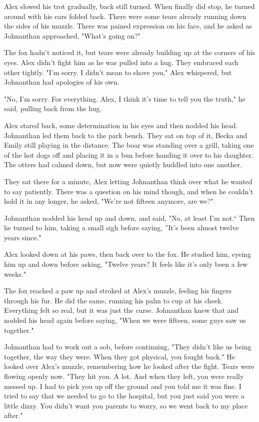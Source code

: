 Alex slowed his trot gradually, back still turned. When finally did
stop, he turned around with his ears folded back. There were some tears
already running down the sides of his muzzle. There was pained
expression on his face, and he asked as Johnanthan approached, "What's
going on?"

The fox hadn't noticed it, but tears were already building up at the
corners of his eyes. Alex didn't fight him as he was pulled into a hug.
They embraced each other tightly. "I'm sorry. I didn't mean to shove
you," Alex whispered, but Johnanthan had apologies of his own.

"No, I'm sorry. For everything. Alex, I think it's time to tell you the
truth," he said, pulling back from the hug.

Alex stared back, some determination in his eyes and then nodded his
head. Johnanthan led them back to the park bench. They sat on top of it,
Becka and Emily still playing in the distance. The boar was standing
over a grill, taking one of the hot dogs off and placing it in a bun
before handing it over to his daughter. The otters had calmed down, but
now were quietly huddled into one another.

They sat there for a minute, Alex letting Johnanthan think over what he
wanted to say patiently. There was a question on his mind though, and
when he couldn't hold it in any longer, he asked, "We're not fifteen
anymore, are we?"

Johnanthan nodded his head up and down, and said, "No, at least I'm
not.`` Then he turned to him, taking a small sigh before saying, ''It's
been almost twelve years since."

Alex looked down at his paws, then back over to the fox. He studied him,
eyeing him up and down before asking, "Twelve years? It feels like it's
only been a few weeks."

The fox reached a paw up and stroked at Alex's muzzle, feeling his
fingers through his fur. He did the same, running his palm to cup at his
cheek. Everything felt so real, but it was just the curse. Johnanthan
knew that and nodded his head again before saying, "When we were
fifteen, some guys saw us together."

Johnanthan had to work out a sob, before continuing, "They didn't like
us being together, the way they were. When they got physical, you fought
back." He looked over Alex's muzzle, remembering how he looked after the
fight. Tears were flowing openly now. "They hit you. A lot. And when
they left, you were really messed up. I had to pick you up off the
ground and you told me it was fine. I tried to say that we needed to go
to the hospital, but you just said you were a little dizzy. You didn't
want you parents to worry, so we went back to my place after."

